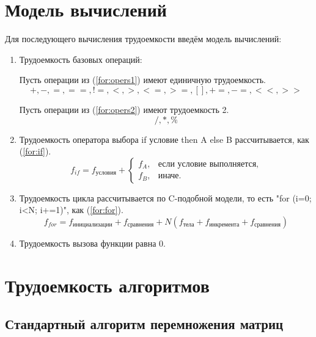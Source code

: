 \section{Модель вычислений}

Для последующего вычисления трудоемкости введём модель вычислений:

\begin{enumerate}
	\item Трудоемкость базовых операций:
	
	Пусть операции из (\ref{for:opers1}) имеют единичную трудоемкость.
	\begin{equation}
	\label{for:opers1}
	+, -, =, ==, !=, <, >, <=, >=, [], +=, -=, <<, >>
	\end{equation}
	
	Пусть операции из (\ref{for:opers2}) имеют трудоемкость 2.
	\begin{equation}
	\label{for:opers2}
	/, *, \%
	\end{equation}
		
	\item Трудоемкость оператора выбора if условие then A else B рассчитывается, как (\ref{for:if}).
	\begin{equation}
	\label{for:if}
	f_{if} = f_{\text{условия}} +
	\begin{cases}
	f_A, & \text{если условие выполняется,}\\
	f_B, & \text{иначе.}
	\end{cases}
	\end{equation}
	\item Трудоемкость цикла рассчитывается по C-подобной модели, то есть "for (i=0; i<N; i+=1)", как (\ref{for:for}).
	\begin{equation}
	\label{for:for}
	f_{for} = f_{\text{инициализации}} + f_{\text{сравнения}} + N(f_{\text{тела}} + f_{\text{инкремента}} + f_{\text{сравнения}})
	\end{equation}
	\item Трудоемкость вызова функции равна 0.
\end{enumerate}



\section{Трудоемкость алгоритмов}
\subsection{Стандартный алгоритм перемножения матриц}

